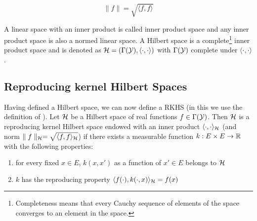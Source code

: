 \begin{equation*}
\parallel f \parallel = \sqrt{\langle f, f \rangle}
\end{equation*}

A linear space with an inner product is called inner product space and any inner product space is also a normed linear space. A Hilbert space is a complete\footnote{Completeness means that every Cauchy sequence of elements of the space converges to an element in the space.} inner product space and is denoted as  $\mathcal{H} = (\Gamma(\mathcal{Y}), \langle \cdot, \cdot \rangle)$ with $\Gamma(\mathcal{Y})$ complete under $\langle \cdot, \cdot \rangle$.

\subsection{Reproducing kernel Hilbert Spaces}
Having defined a Hilbert space, we can now define a RKHS (in this we use the definition of \cite{rasmussen2006gaussian}). Let $\mathcal{H}$ be a Hilbert space of real functions $f \in \Gamma(\mathcal{Y})$. Then $\mathcal{H}$ is a reproducing kernel Hilbert space endowed with an inner product $\langle \cdot, \cdot \rangle_{\mathcal{H}}$ (and norm $\parallel f \parallel_{\mathcal{H}}= \sqrt{\langle f, f \rangle_{\mathcal{H}}}$) if there exists a measurable function $k: E \times E \rightarrow \mathbb{R}$ with the following properties:
\begin{enumerate}
	\item for every fixed $x \in E$, $k(x, x')$ as a function of $x' \in E$ belongs to $\mathcal{H}$
	\item $k$ has the reproducing property $\langle f(\cdot), k(\cdot, x)\rangle_{\mathcal{H}} = f(x)$
\end{enumerate}
